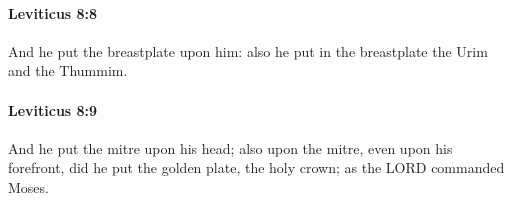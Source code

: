 		\paragraph{Leviticus 8:8} %
			\label{LEVITICUS-8-8}

			And he put the breastplate upon him: also he put in the breastplate the Urim and the Thummim.


		\paragraph{Leviticus 8:9} %
			\label{LEVITICUS-8-9}

			And he put the mitre upon his head; also upon the mitre, even upon his forefront, did he put the golden plate, the holy crown; as the LORD commanded Moses.


